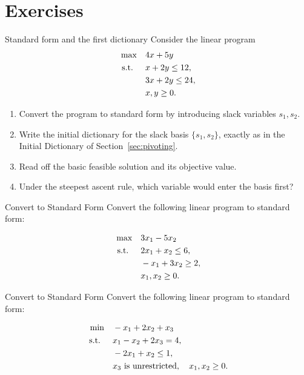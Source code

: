 \section{Exercises}


\begin{ex}{Standard form and the first dictionary}{}
\label{ex:standard-form-warmup-dictionary}
 Consider the linear program
\[
\begin{aligned}
\max \quad & 4x + 5y \\
\mbox{ s.t. } \quad
& x + 2y \leq 12, \\
& 3x + 2y \leq 24, \\
& x, y \geq 0.
\end{aligned}
\]
\begin{enumerate}
    \item Convert the program to standard form by introducing slack variables $s_1, s_2$.
    \item Write the initial dictionary for the slack basis $\{s_1, s_2\}$, exactly as in the Initial Dictionary of Section~\ref{sec:pivoting}.
    \item Read off the basic feasible solution and its objective value.
    \item Under the steepest ascent rule, which variable would enter the basis first?
\end{enumerate}
\end{ex}

\begin{ex}{Convert to Standard Form}{}
\label{ex:standard-form-1}
 Convert the following linear program to standard form:

\[
\begin{aligned}
    \max \quad & 3x_1 - 5x_2 \\
    \mbox{ s.t. } \quad
    & 2x_1 + x_2 \leq 6, \\
    & -x_1 + 3x_2 \geq 2, \\
    & x_1, x_2 \geq 0.
\end{aligned}
\]
\end{ex}

\begin{ex}{Convert to Standard Form}{}
\label{ex:standard-form-2}
 Convert the following linear program to standard form:

\[
\begin{aligned}
    \min \quad & -x_1 + 2x_2 + x_3 \\
    \mbox{ s.t. } \quad
    & x_1 - x_2 + 2x_3 = 4, \\
    & -2x_1 + x_2 \leq 1, \\
    & x_3 \mbox{ is unrestricted}, \quad x_1, x_2 \geq 0.
\end{aligned}
\]
\end{ex}

